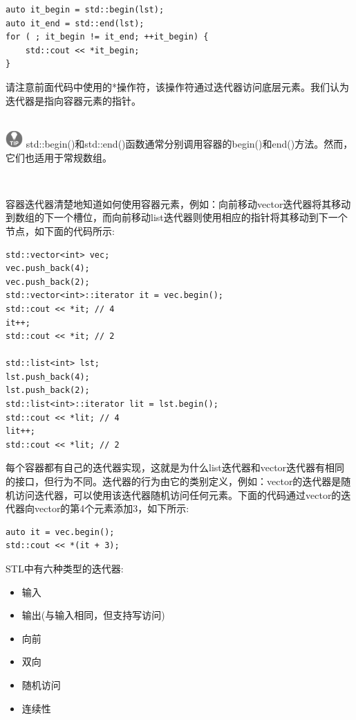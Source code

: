 \begin{lstlisting}[caption={}]
auto it_begin = std::begin(lst);
auto it_end = std::end(lst);
for ( ; it_begin != it_end; ++it_begin) {
	std::cout << *it_begin;
}
\end{lstlisting}

请注意前面代码中使用的*操作符，该操作符通过迭代器访问底层元素。我们认为迭代器是指向容器元素的指针。 \par

\hspace*{\fill} \\ %
\includegraphics[width=0.05\textwidth]{images/tip}
std::begin()和std::end()函数通常分别调用容器的begin()和end()方法。然而，它们也适用于常规数组。 \par
\noindent\textbf{}\ \par

容器迭代器清楚地知道如何使用容器元素，例如：向前移动vector迭代器将其移动到数组的下一个槽位，而向前移动list迭代器则使用相应的指针将其移动到下一个节点，如下面的代码所示: \par

\begin{lstlisting}[caption={}]
std::vector<int> vec;
vec.push_back(4);
vec.push_back(2);
std::vector<int>::iterator it = vec.begin();
std::cout << *it; // 4
it++;
std::cout << *it; // 2

std::list<int> lst;
lst.push_back(4);
lst.push_back(2);
std::list<int>::iterator lit = lst.begin();
std::cout << *lit; // 4
lit++;
std::cout << *lit; // 2
\end{lstlisting}

每个容器都有自己的迭代器实现，这就是为什么list迭代器和vector迭代器有相同的接口，但行为不同。迭代器的行为由它的类别定义，例如：vector的迭代器是随机访问迭代器，可以使用该迭代器随机访问任何元素。下面的代码通过vector的迭代器向vector的第4个元素添加3，如下所示: \par

\begin{lstlisting}[caption={}]
auto it = vec.begin();
std::cout << *(it + 3);
\end{lstlisting}

STL中有六种类型的迭代器: \par

\begin{itemize}
	\item 输入
	\item 输出(与输入相同，但支持写访问)
	\item 向前
	\item 双向
	\item 随机访问
	\item 连续性
\end{itemize}


